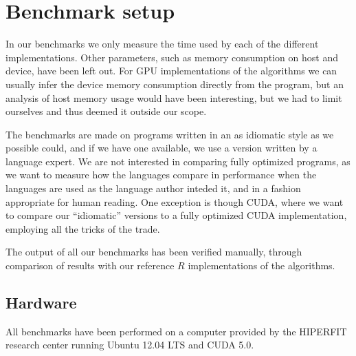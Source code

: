 
\section{Benchmark setup}
In our benchmarks we only measure the time used by each of the
different implementations. Other parameters, such as memory
consumption on host and device, have been left out. For GPU
implementations of the algorithms we can usually infer the device
memory consumption directly from the program, but an analysis of host
memory usage would have been interesting, but we had to limit
ourselves and thus deemed it outside our scope.

The benchmarks are made on programs written in an as idiomatic style
as we possible could, and if we have one available, we use a version
written by a language expert. We are not interested in comparing fully
optimized programs, as we want to measure how the languages compare in
performance when the languages are used as the language author inteded
it, and in a fashion appropriate for human reading. One exception is
though CUDA, where we want to compare our ``idiomatic'' versions to a
fully optimized CUDA implementation, employing all the tricks of the
trade.

The output of all our benchmarks has been verified manually, through
comparison of results with our reference $R$ implementations of the
algorithms.

\subsection{Hardware}
All benchmarks have been performed on a computer provided by the
HIPERFIT research center running Ubuntu 12.04 LTS and CUDA 5.0.

